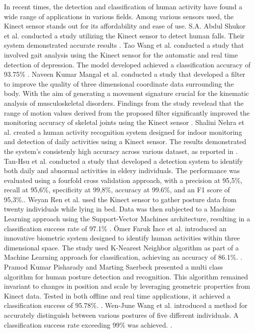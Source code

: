       In recent times, the detection and classification of human activity have found a wide range of applications in various fields. Among various sensors used, the Kinect sensor stands out for its affordability and ease of use. S.A. Abdul Shukor et al. conducted a study utilizing the Kinect sensor to detect human falls. Their system demonstrated accurate results \cite{saidin_analysis_2020}. 
      Tao Wang et al. conducted a study that involved gait analysis using the Kinect sensor for the automatic and real time detection of depression. The model developed achieved a classification accuracy of 93.75\% \cite{wang_gait_2021}.
      Naveen Kumar Mangal et al. conducted a study that developed a filter to improve the quality of three dimensional coordinate data surrounding the body. With the aim of generating a movement signature crucial for the kinematic analysis of musculoskeletal disorders. Findings from the study revelead that the range of motion values derived from the proposed filter significantly improved the monitoring accuracy of skeletal joints using the Kinect sensor \cite{mangal_kinect_2020}. 
      Shalini Nehra et al. created a human activity recognition system designed for indoor monitoring and detection of daily activities using a Kinect sensor. The results demonstrated the system's consistenly high accuracy across various dataset, as reported in \cite{nehra_unobtrusive_2020}.
      Tan-Hsu et al. conducted a study that developed a detection system to identify both daily and abnormal activities in eldery individuals. The performance was evaluated using a fourfold cross validation approach, with a precision at 95,5\%, recall at 95,6\%, specificity at 99,8\%, accuracy at 99.6\%, and an F1 score of 95,3\%.\cite{tan_activity_2020}. 
      Weyan Ren et al. used the Kinect sensor to gather posture data from twenty individuals while lying in bed. Data was then subjected to a Machine Learning approach using the Support-Vector Machines architecture, resulting in a classification success rate of 97.1\% \cite{ren_human_2020}.
      \"{O}mer Faruk \.{I}nce et al. introduced an innovative biometric system designed to identify human activities within three dimensional space. The study used K-Nearest Neighbor algorithm as part of a Machine Learning approach for classification, achieving an accuracy of 86.1\%.  \cite{ince_human_2020}.
      Pramod Kumar Pisharady and Marting Saerbeck presented a multi class algorithm for human posture detection and recognition. This algorithm remained invariant to changes in position and scale by leveraging geometric properties from Kinect data. Tested in both offline and real time applications, it achieved a classification success of 95.78\%. \cite{pisharady_kinect_2013}.
      Wen-June Wang et al. introduced a method for accurately distinguish between various postures of five different individuals. A classification success rate exceeding 99\% was achieved. \cite{wang_gait_2021}.

